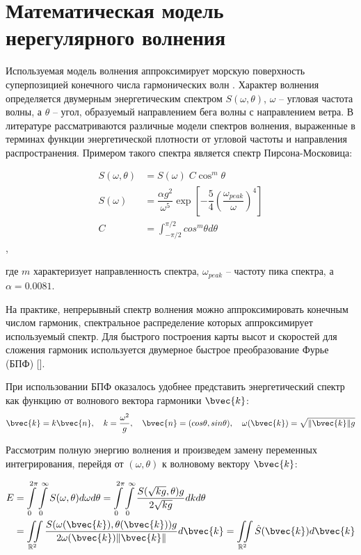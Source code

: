 \section{Математическая модель нерегулярного волнения}

Используемая модель волнения аппроксимирует морскую поверхность суперпозицией конечного числа гармонических волн \cite{lopatuhin2004}. Характер волнения определяется двумерным энергетическим спектром $S(\omega, \theta)$, $\omega$ -- угловая частота волны, а $\theta$ -- угол, образуемый направлением бега волны с направлением ветра. В литературе \cite{lopatuhin2004} рассматриваются различные модели спектров волнения, выраженные в терминах функции энергетической плотности от угловой частоты и направления распространения. Примером такого спектра является спектр Пирсона-Московица:

\begin{equation}
	\begin{split}
	S(\omega, \theta) &= S(\omega) \; C \cos^m\theta \\
	S(\omega) &= \dfrac{\alpha g^2}{\omega^5} \exp \left[ 
	  -\dfrac{5}{4} \left( \dfrac{\omega_{peak}}{\omega} \right)^{4} 
	\right]  \\
	C &= \int_{-\pi/2}^{\pi/2} cos^m\theta d\theta
	\end{split}
\end{equation}, 

где $m$ характеризует направленность спектра, $\omega_{peak}$ -- частоту пика спектра, а $\alpha = 0.0081$.

На практике, непрерывный спектр волнения можно аппроксимировать конечным числом гармоник, спектральное распределение которых аппроксимирует используемый спектр. Для быстрого построения карты высот и скоростей для сложения гармоник используется двумерное быстрое преобразование Фурье (БПФ) [].
 
При использовании БПФ оказалось удобнее представить энергетический спектр как функцию от волнового вектора гармоники $\bvec{k}$:
$$ \bvec{k} = k\bvec{n},\quad 
k = \frac{\omega^2}{g} ,\quad 
\bvec{n}=(cos \theta, sin \theta), \quad 
\omega(\bvec{k}) = \sqrt{\lVert \bvec{k} \rVert g} $$

Рассмотрим полную энергию волнения и произведем замену переменных интегрирования, перейдя от $(\omega, \theta)$ к волновому вектору $\bvec{k}$:

\begin{equation}
	\begin{split}
	E &= \int\limits_0^{2\pi}
		 \int\limits_0^\infty S(\omega, \theta) d\omega d\theta
	  = \int\limits_0^{2\pi}
		 \int\limits_0^\infty 
			 \frac {S(\sqrt{kg}, \theta)g} {2\sqrt{kg}} dk d\theta\\
	  &= \iint\limits_{\mathbb{R}^2}
			 \frac{S(\omega(\bvec{k}), \theta(\bvec{k})) g}
				  {2\omega(\bvec{k}) \lVert \bvec{k} \rVert} d\bvec{k}
	  = \iint\limits_{\mathbb{R}^2} \hat{S}(\bvec{k})d\bvec{k}
	\end{split}
\end{equation}

